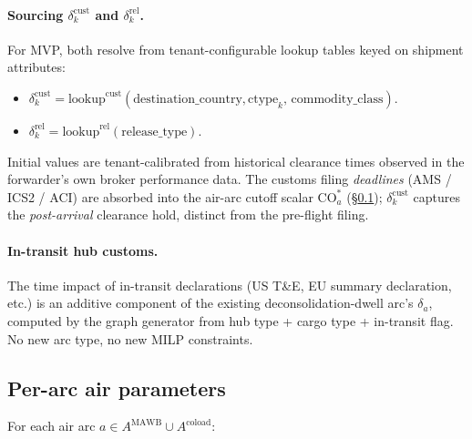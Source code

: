 \documentclass[11pt,a4paper]{article}
\newcommand{\ctype}{\text{ctype}}
\theoremstyle{definition}
\begin{document}
\paragraph{Sourcing $\delta^{\text{cust}}_k$ and $\delta^{\text{rel}}_k$.}
For MVP, both resolve from tenant-configurable lookup tables keyed on
shipment attributes:
\begin{itemize}[noitemsep]
  \item $\delta^{\text{cust}}_k = \text{lookup}^{\text{cust}}(\text{destination\_country},
        \ctype_k,\, \text{commodity\_class})$.
  \item $\delta^{\text{rel}}_k = \text{lookup}^{\text{rel}}(\text{release\_type})$.
\end{itemize}
Initial values are tenant-calibrated from historical clearance times observed
in the forwarder's own broker performance data. The customs filing
\emph{deadlines} (AMS / ICS2 / ACI) are absorbed into the air-arc cutoff
scalar $\text{CO}_a^*$ (\S\ref{sec:air-arc-params}); $\delta^{\text{cust}}_k$
captures the \emph{post-arrival} clearance hold, distinct from the pre-flight
filing.

\paragraph{In-transit hub customs.}
The time impact of in-transit declarations (US T\&E, EU summary declaration,
etc.) is an additive component of the existing deconsolidation-dwell arc's
$\delta_a$, computed by the graph generator from hub type + cargo type +
in-transit flag. No new arc type, no new MILP constraints.

\subsection{Per-arc air parameters}
\label{sec:air-arc-params}

For each air arc $a \in A^{\text{MAWB}} \cup A^{\text{coload}}$:
\end{document}
